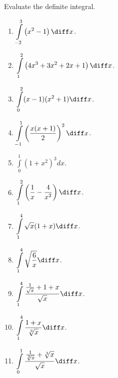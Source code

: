 Evaluate the definite integral.
\begin{multicols}{3}
\begin{enumerate}
\item $\displaystyle \int\limits_{-2}^{3} \left(x^2-1 \right)  \diff x$.


\item $\displaystyle \int\limits_{1}^{2} \left(4x^3+3x^2+2x+1\right)  \diff x$.

\item $\displaystyle \int\limits_{0}^{2}(x-1)(x^2+1)  \diff x$.

\item $\displaystyle \int\limits_{-1}^{1} \left( \frac{x(x+1) }{ 2} \right)^2  \diff x$.

\item $\displaystyle \int\limits_{0}^{1}(1+x^2)^3 dx$.

\item $\displaystyle \int \limits_{1}^{2} \left(\frac{1}{x} - \frac{4}{x^2} \right)  \diff x$.

\item $\displaystyle \int\limits_{1}^{4}\sqrt{x}(1+x) \diff x$.

\item $\displaystyle \int\limits_{1}^{4} \sqrt{ \frac{6 }{x }} \diff x$.

\item $\displaystyle \int \limits_{1}^{4} \frac{ \frac{ 1}{ \sqrt{x}}+1+x}{ \sqrt{x}}  \diff x$.

\answer{$\left[ \right]_{}^{}=$}
\item $\displaystyle \int \limits_{1}^{4} \frac{1+x}{ \sqrt[3]{x}} \diff x$.

\answer{$\left[ \right]_{}^{}=$}
\item $\displaystyle \int\limits_{0}^1 \frac{\frac{1}{ \sqrt[3]{x}} +\sqrt[3]{x}}{ \sqrt{x}}\diff x$.


\end{enumerate}
\end{multicols}
